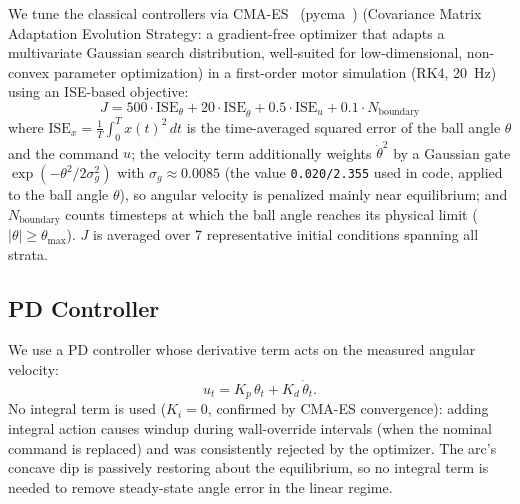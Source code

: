 We tune the classical controllers via CMA-ES~\cite{hansen2016cma} (pycma~\cite{hansen2019pycma})
(Covariance Matrix Adaptation Evolution Strategy: a gradient-free
optimizer that adapts a multivariate Gaussian search distribution,
well-suited for low-dimensional, non-convex parameter optimization)
in a first-order motor simulation (RK4, 20~Hz) using an ISE-based objective:
\begin{equation}
  J = 500 \cdot \mathrm{ISE}_\theta + 20 \cdot \mathrm{ISE}_{\dot\theta}
      + 0.5 \cdot \mathrm{ISE}_u + 0.1 \cdot N_\text{boundary}
\end{equation}
where $\mathrm{ISE}_x = \tfrac{1}{T}\int_0^T x(t)^2\,dt$ is the
time-averaged squared error of the ball angle $\theta$ and the
command $u$; the velocity term additionally weights $\dot\theta^2$ by a
Gaussian gate $\exp(-\theta^2/2\sigma_g^2)$ with $\sigma_g \approx 0.0085$
(the value \texttt{0.020/2.355} used in code, applied to the ball
angle $\theta$), so angular velocity is penalized mainly near
equilibrium; and $N_\text{boundary}$ counts
timesteps at which the ball angle reaches its physical limit
($|\theta| \geq \theta_\text{max}$). $J$ is averaged over 7
representative initial conditions spanning all strata.

\subsection{PD Controller}

We use a PD controller whose derivative term acts on the measured angular
velocity:
\begin{equation}
  u_t = K_p\,\theta_t + K_d\,\dot{\theta}_t.
  \label{eq:pd_law}
\end{equation}
No integral term is used ($K_i = 0$, confirmed by CMA-ES convergence):
adding integral action causes windup during wall-override intervals
(when the nominal command is replaced) and was consistently rejected by
the optimizer. The arc's concave dip is passively restoring about the
equilibrium, so no integral term is needed to remove steady-state
angle error in the linear regime.

